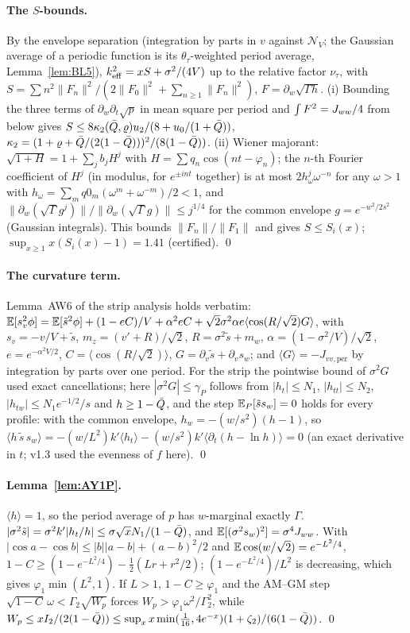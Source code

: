 \paragraph*{The $S$-bounds.}
By the envelope separation (integration by parts in $v$ against $\mathcal N_V$; the Gaussian average of a periodic function is its $\theta_\tau$-weighted
period average, Lemma~\ref{lem:BL5}), $k_{\mathrm{eff}}^2=xS+\sigma^2/(4V)$ up to the relative factor $\nu_\tau$, with $S=\sum n^2\|F_n\|^2/(2\|F_0\|^2+\sum_{n\ge1}\|F_n\|^2)$, $F=\partial_w\sqrt{\Gamma h}$.
(i) Bounding the three terms of $\partial_w\partial_t\sqrt{p}$ in mean square per period and $\int F^2=J_{ww}/4$ from below gives
$S\le8\kappa_2(\bar Q,\varrho)u_2/(8+u_0/(1+\bar Q))$, $\kappa_2=(1+\varrho+\bar Q/(2(1-\bar Q)))^2/(8(1-\bar Q))$.
(ii) Wiener majorant: $\sqrt{1+H}=1+\sum_jb_jH^j$ with $H=\sum q_n\cos(nt-\varphi_n)$; the $n$-th Fourier coefficient of $H^j$ (in modulus, for $e^{\pm int}$ together) is at most $2h_\omega^j\omega^{-n}$ for
any $\omega>1$ with $h_\omega=\sum_mq0_m(\omega^m+\omega^{-m})/2<1$, and $\|\partial_w(\sqrt\Gamma g^j)\|/\|\partial_w(\sqrt\Gamma g)\|\le j^{1/4}$ for the
common envelope $g=e^{-w^2/2s^2}$ (Gaussian integrals). This bounds $\|F_n\|/\|F_1\|$ and gives $S\le S_i(x)$; $\sup_{x\ge1}x(S_i(x)-1)=1.41$ (certified). \qed

\paragraph*{The curvature term.}
Lemma~AW6 of the strip analysis holds verbatim: $\mathbb{E}[s_v^2\phi]=\mathbb{E}[\tilde s^2\phi]+(1-eC)/V+\alpha^2eC+\sqrt2\sigma^2\alpha e\langle\cos(R/\sqrt2)G\rangle$, with
$s_v=-v/V+\tilde s$, $m_z=(v'+R)/\sqrt2$, $R=\sigma^2\tilde s+m_w$, $\alpha=(1-\sigma^2/V)/\sqrt2$, $e=e^{-\alpha^2V/2}$, $C=\langle\cos(R/\sqrt2)\rangle$, $G=\partial_v\tilde s+\partial_vs_w$;
and $\langle G\rangle=-J_{vv,\mathrm{per}}$ by integration by parts over one period. For the strip the pointwise bound of $\sigma^2G$ used exact
cancellations; here $|\sigma^2G|\le\gamma_P$ follows from $|h_t|\le N_1$, $|h_{tt}|\le N_2$, $|h_{tw}|\le N_1e^{-1/2}/s$ and $h\ge1-\bar Q$, and the
step $\mathbb{E}_P[\tilde ss_w]=0$ holds for every profile: with the common envelope, $h_w=-(w/s^2)(h-1)$, so $\langle h\,\tilde s\,s_w\rangle=-(w/L^2)k'\langle h_t\rangle-(w/s^2)k'\langle\partial_t(h-\ln h)\rangle=0$
(an exact derivative in $t$; v1.3 used the evenness of $f$ here). \qed

\paragraph*{Lemma~\ref{lem:AY1P}.}
$\langle h\rangle=1$, so the period average of $p$ has $w$-marginal exactly $\Gamma$. $|\sigma^2\tilde s|=\sigma^2k'|h_t/h|\le\sigma\sqrt xN_1/(1-\bar Q)$, and
$\mathbb{E}[(\sigma^2s_w)^2]=\sigma^4J_{ww}$. With $|\cos a-\cos b|\le|b||a-b|+(a-b)^2/2$ and $\mathbb{E}\cos(w/\sqrt2)=e^{-L^2/4}$,
$1-C\ge(1-e^{-L^2/4})-\tfrac12(Lr+r^2/2)$; $(1-e^{-L^2/4})/L^2$ is decreasing, which gives $\varphi_1\min(L^2,1)$. If $L>1$, $1-C\ge\varphi_1$ and the
AM--GM step $\sqrt{1-C}\,\omega<\Gamma_2\sqrt{W_p}$ forces $W_p>\varphi_1\omega^2/\Gamma_2^2$, while $W_p\le xI_2/(2(1-\bar Q))\le
\sup_xx\min(\tfrac1{16},4e^{-x})(1+\zeta_2)/(6(1-\bar Q))$. \qed

